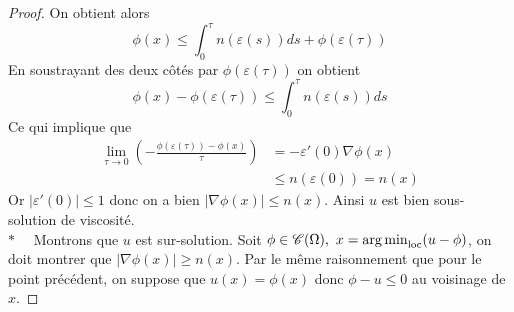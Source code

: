 \begin{proof}
On obtient alors
\begin{equation*}
    \phi(x)\le \int^{\tau}_0 n(\varepsilon(s))ds +
    \phi(\varepsilon(\tau))
\end{equation*}
En soustrayant des deux côtés par $\phi(\varepsilon(\tau))$ on obtient
\begin{equation*}
    \phi(x)-\phi(\varepsilon(\tau))\le \int^{\tau}_0 n(\varepsilon(s))ds
\end{equation*}
Ce qui implique que
\begin{equation*}
    \begin{split}
        \underset{\tau\longrightarrow0}{\lim}\left(-\frac{\phi(\varepsilon(\tau))-\phi(x)}{\tau}\right) &= -\varepsilon'(0)\nabla\phi(x)\\
        &\le n(\varepsilon(0))=n(x)
    \end{split}
\end{equation*}
Or $|\varepsilon'(0)|\le 1$ donc on a bien $|\nabla \phi (x)|\le n(x)$. Ainsi $u$ est bien sous-solution de viscosité. \\

$\ast \quad$ Montrons que $u$ est sur-solution. Soit $ \phi \in \mathscr{C}(\Omega),\ x=\operatorname*{arg\,min}_{\text{loc}}(u-\phi)$, on doit montrer que $|\nabla\phi (x)|\ge n(x)$. Par le même raisonnement que pour le point précédent, on suppose que $u(x)=\phi(x)$ donc $\phi-u\le 0$ au voisinage de $x$.



\end{proof}
